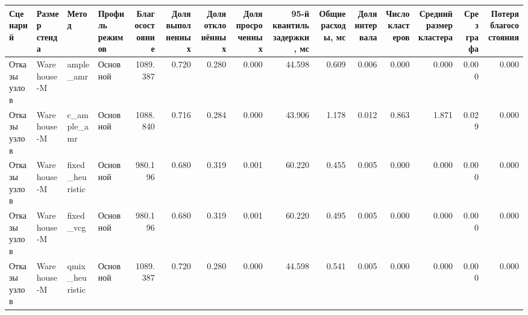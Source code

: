 \begin{tabular}{llllrrrrrrrrrrr}
\toprule
 Сценарий & Размер стенда & Метод & Профиль режимов & Благосостояние & Доля выполненных & Доля отклонённых & Доля просроченных & 95-й квантиль задержки, мс & Общие расходы, мс & Доля интервала & Число кластеров & Средний размер кластера & Срез графа & Потеря благосостояния \\
\midrule
 Отказы узлов & Warehouse-M & ample_amr & Основной & 1089.387 & 0.720 & 0.280 & 0.000 & 44.598 & 0.609 & 0.006 & 0.000 & 0.000 & 0.000 & 0.000 \\
 Отказы узлов & Warehouse-M & c_ample_amr & Основной & 1088.840 & 0.716 & 0.284 & 0.000 & 43.906 & 1.178 & 0.012 & 0.863 & 1.871 & 0.029 & 0.000 \\
 Отказы узлов & Warehouse-M & fixed_heuristic & Основной & 980.196 & 0.680 & 0.319 & 0.001 & 60.220 & 0.455 & 0.005 & 0.000 & 0.000 & 0.000 & 0.000 \\
 Отказы узлов & Warehouse-M & fixed_vcg & Основной & 980.196 & 0.680 & 0.319 & 0.001 & 60.220 & 0.495 & 0.005 & 0.000 & 0.000 & 0.000 & 0.000 \\
 Отказы узлов & Warehouse-M & qmix_heuristic & Основной & 1089.387 & 0.720 & 0.280 & 0.000 & 44.598 & 0.541 & 0.005 & 0.000 & 0.000 & 0.000 & 0.000 \\
\bottomrule
\end{tabular}
